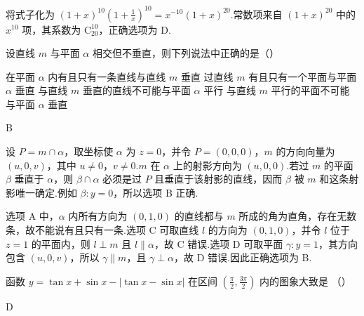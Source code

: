 \begin{solution}
将式子化为 \((1+x)^{10}\left(1+\frac1x\right)^{10}=x^{-10}(1+x)^{20}\).常数项来自 \((1+x)^{20}\) 中的 \(x^{10}\) 项，其系数为 \(\mathrm C_{20}^{10}\)，正确选项为 D.
\end{solution}

\begin{problem}
设直线 \(m\) 与平面 \(\alpha\) 相交但不垂直，则下列说法中正确的是（\quad）

\choices
    {在平面 \(\alpha\) 内有且只有一条直线与直线 \(m\) 垂直}
    {过直线 \(m\) 有且只有一个平面与平面 \(\alpha\) 垂直}
    {与直线 \(m\) 垂直的直线不可能与平面 \(\alpha\) 平行}
    {与直线 \(m\) 平行的平面不可能与平面 \(\alpha\) 垂直}
\end{problem}

\begin{answer}
B
\end{answer}

\begin{solution}
设 \(P=m\cap\alpha\)，取坐标使 \(\alpha\) 为 \(z=0\)，并令 \(P=(0,0,0)\)，\(m\) 的方向向量为 \((u,0,v)\)，其中 \(u\ne0\)，\(v\ne0\).\(m\) 在 \(\alpha\) 上的射影方向为 \((u,0,0)\).若过 \(m\) 的平面 \(\beta\) 垂直于 \(\alpha\)，则 \(\beta\cap\alpha\) 必须是过 \(P\) 且垂直于该射影的直线，因而 \(\beta\) 被 \(m\) 和这条射影唯一确定.例如 \(\beta:y=0\)，所以选项 B 正确.

选项 A 中，\(\alpha\) 内所有方向为 \((0,1,0)\) 的直线都与 \(m\) 所成的角为直角，存在无数条，故不能说有且只有一条.选项 C 可取直线 \(l\) 的方向为 \((0,1,0)\)，并令 \(l\) 位于 \(z=1\) 的平面内，则 \(l\perp m\) 且 \(l\parallel\alpha\)，故 C 错误.选项 D 可取平面 \(\gamma:y=1\)，其方向包含 \((u,0,v)\)，所以 \(\gamma\parallel m\)，且 \(\gamma\perp\alpha\)，故 D 错误.因此正确选项为 B.
\end{solution}

\begin{problem}
函数 \( y = \tan x + \sin x - |\tan x - \sin x| \) 在区间 \(\left(\frac{\pi}{2}, \frac{3\pi}{2}\right)\) 内的图象大致是 （\quad）

    {}
    {}
    {}
\end{problem}

\begin{answer}
D
\end{answer}

